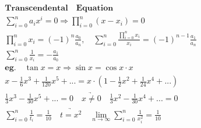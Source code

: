 \documentclass{article}
\begin{document}
\begin{align*}
    \mathbf{Transcendental \quad Equation} \\ 
    \sum_{i=0}^{n}a_{i}x^i = 0 \Longrightarrow \prod_{i=0}^{n}(x-x_{i})=0 \\ 
    \prod_{i=0}^{n}x_{i} = (-1)^{n}\frac{a_{0}}{a_{n}},\quad \sum_{i=0}^{n}\frac{\prod_{i=0}^{n}x_{i}}{x_{i}} = (-1)^{n-1}\frac{a_{1}}{a_{n}} \\ 
    \sum_{i=0}^{n}\frac{1}{x_{i}} = -\frac{a_{1}}{a_{0}} \\ 
    \mathbf{eg.} \quad \tan x = x \Longrightarrow \sin{x} = \cos{x} \cdot x \\
    x - \frac{1}{6}x^3 + \frac{1}{120}x^5 +... = x \cdot (1-\frac{1}{2}x^2+\frac{1}{24}x^4+...) \\
    \frac{1}{3}x^3-\frac{1}{30}x^5+... = 0 \quad \underrightarrow{x \not= 0} \quad \frac{1}{3}x^2-\frac{1}{30}x^4+... = 0 \\
    \sum_{i=0}^{n}\frac{1}{t_{i}} = \frac{1}{10} \quad \underrightarrow{t = x^2} \quad \lim_{n \to \infty}\sum_{i=0}^{n}\frac{1}{x_{i}^2} = \frac{1}{10} 
\end{align*}

\clearpage
\end{document}
